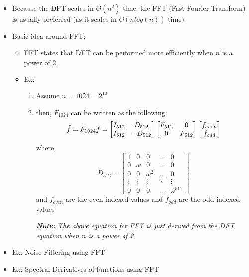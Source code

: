 \documentclass[11.5pt,a4paper]{article}
\begin{document}
\begin{itemize}
    \item Because the DFT scales in $O(n^2)$ time, the FFT (Fast Fourier Transform) is usually preferred (as it scales in $O(nlog(n))$ time)
    \item Basic idea around FFT:
    \begin{itemize}
        \item FFT states that DFT can be performed more efficiently when $n$ is a power of 2.
        \item Ex:
        \begin{enumerate}
            \item Assume $n=1024 = 2^{10}$
            \item then, $F_{1024}$ can be written as the following:
            \begin{equation*}
                \Hat{f} = F_{1024}f = 
                \begin{bmatrix}
                     I_{512} & D_{512} \\
                     I_{512} & -D_{512}
                \end{bmatrix} 
                \begin{bmatrix}
                    F_{512} & 0 \\
                    0 & F_{512}
                \end{bmatrix}
                \begin{bmatrix}
                    f_{even} \\
                    f_{odd}
                \end{bmatrix}
            \end{equation*}
            where,
            \begin{equation*}
                D_{512} = 
                \begin{bmatrix}
                    1 & 0 & 0 & \hdots & 0 \\
                    0 & \omega & 0 & \hdots & 0 \\
                    0 & 0 & \omega^2 & \hdots & 0 \\
                    \vdots & \vdots & \vdots & \ddots & \vdots \\
                    0 & 0 & 0 & \hdots & \omega^{511}
                \end{bmatrix}
            \end{equation*}
            and $f_{even}$ are the even indexed values and $f_{odd}$ are the odd indexed values
            
            \textit{\textbf{Note: }The above equation for FFT is just derived from the DFT equation when $n$ is a power of 2}
        \end{enumerate}
    \end{itemize}
    \item Ex: Noise Filtering using FFT
    \item Ex: Spectral Derivatives of functions using FFT
    
\end{itemize}
\end{document}
